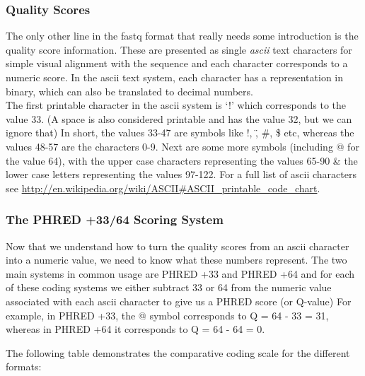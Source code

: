 \subsubsection{Quality Scores}
\begin{information}
The only other line in the fastq format that really needs some introduction is the quality score information.
These are presented as single \textit{ascii} text characters for simple visual alignment with the sequence and each character corresponds to a numeric score.
In the ascii text system, each character has a representation in binary, which can also be translated to decimal numbers.\\

The first printable character in the ascii system is `!' which corresponds to the value 33. 
(A space is also considered printable and has the value 32, but we can ignore that)
In short, the values 33-47 are symbols like !, \", \#, \$ etc, whereas the values 48-57 are the characters 0-9.
Next are some more symbols (including @ for the value 64), with the upper case characters representing the values 65-90 \& the lower case letters representing the values 97-122.
For a full list of ascii characters see \url{http://en.wikipedia.org/wiki/ASCII#ASCII_printable_code_chart}.
\end{information}

\subsubsection{The PHRED +33/64 Scoring System}
\begin{information}
Now that we understand how to turn the quality scores from an ascii character into a numeric value, we need to know what these numbers represent.
The two main systems in common usage are PHRED +33 and PHRED +64 and for each of these coding systems we either subtract 33 or 64 from the numeric value associated with each ascii character to give us a PHRED score (or Q-value)
For example, in PHRED +33, the @ symbol corresponds to Q = 64 - 33 = 31, whereas in PHRED +64 it corresponds to Q = 64 - 64 = 0. \\
\end{information}

The following table demonstrates the comparative coding scale for the different formats: \\

